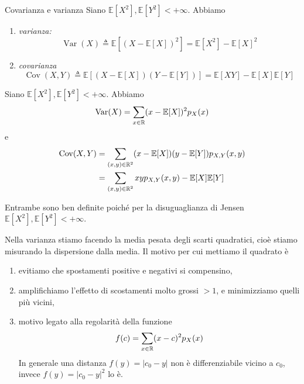 \documentclass[a4paper]{article}
\begin{document}
\begin{snippetdefinition}{Covarianza e varianza}
    Siano \(\mathbb E[X^2], \mathbb E[Y^2] < +\infty\). Abbiamo
    \begin{enumerate}
        \item \emph{varianza:} \[
                \operatorname{Var}(X) \triangleq
                \mathbb E[(X-\mathbb E[X])^2] = \mathbb E[X^2] - \mathbb E[X]^2
            \]
        \item \emph{covarianza} \[
                \operatorname{Cov}(X,Y) \triangleq
                \mathbb E[(X-\mathbb E[X])(Y-\mathbb E[Y])]
                = \mathbb E[XY] - \mathbb E[X]\mathbb E[Y]
            \]
    \end{enumerate}
\end{snippetdefinition}

\begin{snippetproposition}{}
    Siano \(\mathbb E[X^2], \mathbb E[Y^2] < +\infty\). Abbiamo
    \begin{align*}
        \operatorname{Var}(X) = \sum_{x\in\mathbb{R}}
        (x- \mathbb E[X])^2p_X(x)
    \end{align*}
    e
    \begin{align*}
        \operatorname{Cov}(X,Y) &= \sum_{(x,y)\in\mathbb{R}^2}
        (x- \mathbb E[X])(y- \mathbb E[Y])p_{X,Y}(x,y) \\
        &= \sum_{(x,y)\in\mathbb{R}^2}
        xy p_{X,Y}(x,y) - \mathbb E[X]\mathbb E[Y]
    \end{align*}
\end{snippetproposition}

Entrambe sono ben definite poiché per la disuguaglianza di Jensen
\(\mathbb E[X^2], \mathbb E[Y^2] < +\infty\).

Nella varianza stiamo facendo la media pesata degli scarti quadratici,
cioè stiamo misurando la dispersione dalla media.
Il motivo per cui mettiamo il quadrato è
\begin{enumerate}
    \item evitiamo che spostamenti positive e negativi si compensino,
    \item amplifichiamo l'effetto di scostamenti molto grossi \(>1\),
        e minimizziamo quelli più vicini,
    \item motivo legato alla regolarità della funzione
        \[
            f(c) = \sum_{x \in \mathbb{R}}
            (x-c)^2 p_X(x)
        \]
        In generale una distanza \(f(y) = |c_0 - y|\) non è differenziabile vicino a \(c_0\),
        invece \(f(y) = |c_0 -y|^2\) lo è.
\end{enumerate}
\end{document}
